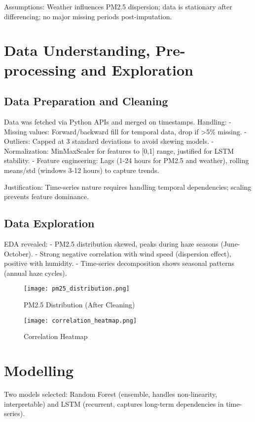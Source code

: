 \documentclass{article}
\begin{document}
Assumptions: Weather influences PM2.5 dispersion; data is stationary after differencing; no major missing periods post-imputation.

\section{Data Understanding, Pre-processing and Exploration}

\subsection{Data Preparation and Cleaning}
Data was fetched via Python APIs and merged on timestamps. Handling:
- Missing values: Forward/backward fill for temporal data, drop if >5\% missing.
- Outliers: Capped at 3 standard deviations to avoid skewing models.
- Normalization: MinMaxScaler for features to [0,1] range, justified for LSTM stability.
- Feature engineering: Lags (1-24 hours for PM2.5 and weather), rolling means/std (windows 3-12 hours) to capture trends.

Justification: Time-series nature requires handling temporal dependencies; scaling prevents feature dominance.

\subsection{Data Exploration}
EDA revealed:
- PM2.5 distribution skewed, peaks during haze seasons (June-October).
- Strong negative correlation with wind speed (dispersion effect), positive with humidity.
- Time-series decomposition shows seasonal patterns (annual haze cycles).

\begin{figure}[h]
\centering
\texttt{[image: pm25\_distribution.png]}
\caption{PM2.5 Distribution (After Cleaning)}
\end{figure}

\begin{figure}[h]
\centering
\texttt{[image: correlation\_heatmap.png]}
\caption{Correlation Heatmap}
\end{figure}

\section{Modelling}

Two models selected: Random Forest (ensemble, handles non-linearity, interpretable) and LSTM (recurrent, captures long-term dependencies in time-series).
\end{document}

